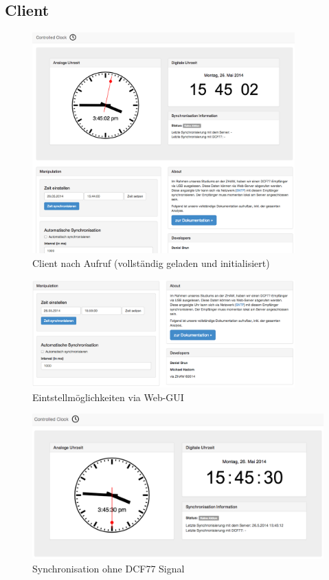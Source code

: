 \subsection{Client}
\begin{figure}[htbp!]
	\caption{Client nach Aufruf (vollständig geladen und initialisiert)}
	\centering
		\includegraphics[width=0.9\textwidth]{./images/screenshots/client_full_initialised.png}
\end{figure}

\begin{figure}[htbp!]
	\caption{Eintstellmöglichkeiten via Web-GUI}
	\centering
		\includegraphics[width=0.9\textwidth]{./images/screenshots/client_controlling.png}
\end{figure}

\begin{figure}[htbp!]
	\caption{Synchronisation ohne DCF77 Signal}
	\centering
		\includegraphics[width=1\textwidth]{./images/screenshots/client_clock_sync_without_dcf77.png}
\end{figure}

